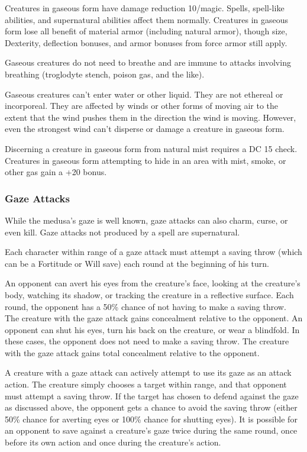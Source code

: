 Creatures in gaseous form have damage reduction 10/magic. Spells, spell-like abilities, and supernatural abilities affect them normally. Creatures in gaseous form lose all benefit of material armor (including natural armor), though size, Dexterity, deflection bonuses, and armor bonuses from force armor still apply.

Gaseous creatures do not need to breathe and are immune to attacks involving breathing (troglodyte stench, poison gas, and the like).

Gaseous creatures can't enter water or other liquid. They are not ethereal or incorporeal. They are affected by winds or other forms of moving air to the extent that the wind pushes them in the direction the wind is moving. However, even the strongest wind can't disperse or damage a creature in gaseous form.

Discerning a creature in gaseous form from natural mist requires a DC 15  check. Creatures in gaseous form attempting to hide in an area with mist, smoke, or other gas gain a +20 bonus.

\subsubsection{Gaze Attacks}
While the medusa's gaze is well known, gaze attacks can also charm, curse, or even kill. Gaze attacks not produced by a spell are supernatural.

Each character within range of a gaze attack must attempt a saving throw (which can be a Fortitude or Will save) each round at the beginning of his turn.

An opponent can avert his eyes from the creature's face, looking at the creature's body, watching its shadow, or tracking the creature in a reflective surface. Each round, the opponent has a 50\% chance of not having to make a saving throw. The creature with the gaze attack gains concealment relative to the opponent. An opponent can shut his eyes, turn his back on the creature, or wear a blindfold. In these cases, the opponent does not need to make a saving throw. The creature with the gaze attack gains total concealment relative to the opponent.

A creature with a gaze attack can actively attempt to use its gaze as an attack action. The creature simply chooses a target within range, and that opponent must attempt a saving throw. If the target has chosen to defend against the gaze as discussed above, the opponent gets a chance to avoid the saving throw (either 50\% chance for averting eyes or 100\% chance for shutting eyes). It is possible for an opponent to save against a creature's gaze twice during the same round, once before its own action and once during the creature's action.

